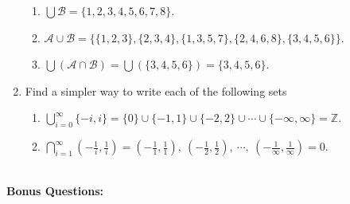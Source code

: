 \documentclass{article}
\begin{document}
\begin{enumerate}
\begin{enumerate}
    			\item $\displaystyle \bigcup \mathcal{B} = \{ 1, 2, 3, 4, 5, 6, 7, 8 \}$.

    			\item $\mathcal{A} \cup \mathcal{B} = \{ \{ 1, 2, 3 \}, \{ 2, 3, 4 \}, \{ 1, 3, 5, 7 \}, \{ 2, 4, 6, 8 \}, \{ 3, 4, 5, 6 \} \}$.

    			\item $\displaystyle \bigcup \left( \mathcal{A} \cap \mathcal{B} \right) = \bigcup(\{ {3, 4, 5, 6} \}) = \{ 3, 4, 5, 6 \}$.
    		\end{enumerate}

    	\item Find a simpler way to write each of the following sets
    		\begin{enumerate}

    			\item $\displaystyle \bigcup_{i=0}^{\infty} \{ \minus i, i \} = \{ 0 \} \cup \{ \minus 1, 1 \} \cup \{\minus 2, 2 \} \cup \cdots \cup \{ \minus \infty, \infty \} = \mathbb{Z}$.

    			\item $\displaystyle \bigcap_{i=1}^{\infty} \left ( \minus\frac{1}{i}, \frac{1}{i} \right) = \left (\minus \frac{1}{1}, \frac{1}{1} \right), \  \left (\minus\frac{1}{2}, \frac{1}{2} \right), \  \cdots, \ \left (\minus\frac{1}{\infty}, \frac{1}{\infty} \right)  = 0$.\\\\
    		\end{enumerate}
    \end{enumerate}
    
    \textbf{Bonus Questions:}
    
\end{document}
